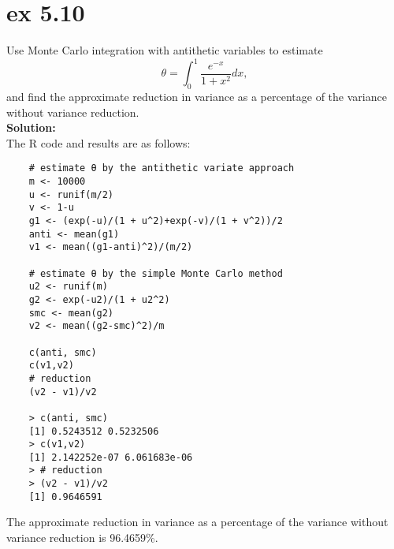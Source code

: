 \documentclass[UTF8]{ctexart}
\begin{document}
\section{ex 5.10}
Use Monte Carlo integration with antithetic variables to estimate
\begin{equation*}
    \theta = \int_{0}^{1} \frac{e^{-x}}{1+x^2} dx,
\end{equation*}
and find the approximate reduction in variance as a percentage of the variance
without variance reduction.\\
\textbf{Solution:}\\
The R code and results are as follows:
\begin{lstlisting}
    # estimate θ by the antithetic variate approach
    m <- 10000
    u <- runif(m/2)
    v <- 1-u
    g1 <- (exp(-u)/(1 + u^2)+exp(-v)/(1 + v^2))/2
    anti <- mean(g1)
    v1 <- mean((g1-anti)^2)/(m/2)
    
    # estimate θ by the simple Monte Carlo method
    u2 <- runif(m)
    g2 <- exp(-u2)/(1 + u2^2)
    smc <- mean(g2)
    v2 <- mean((g2-smc)^2)/m
    
    c(anti, smc)
    c(v1,v2)
    # reduction
    (v2 - v1)/v2

    > c(anti, smc)
    [1] 0.5243512 0.5232506
    > c(v1,v2)
    [1] 2.142252e-07 6.061683e-06
    > # reduction
    > (v2 - v1)/v2
    [1] 0.9646591
\end{lstlisting}
The approximate reduction in variance as a percentage of the variance without variance
reduction is 96.4659\%.\\
\end{document}

